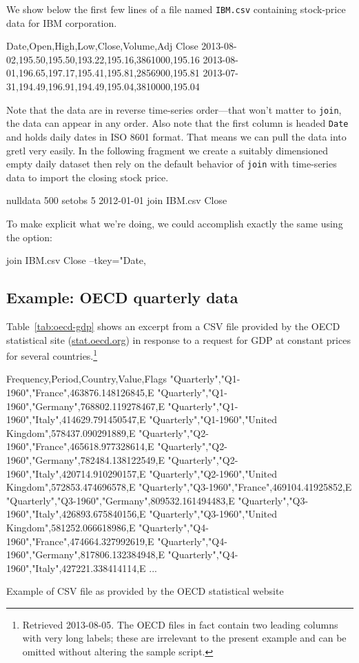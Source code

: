 We show below the first few lines of a file named \texttt{IBM.csv}
containing stock-price data for IBM corporation.

\begin{code}
Date,Open,High,Low,Close,Volume,Adj Close
2013-08-02,195.50,195.50,193.22,195.16,3861000,195.16
2013-08-01,196.65,197.17,195.41,195.81,2856900,195.81
2013-07-31,194.49,196.91,194.49,195.04,3810000,195.04
\end{code}

Note that the data are in reverse time-series order---that won't
matter to \texttt{join}, the data can appear in any order. Also note
that the first column is headed \texttt{Date} and holds daily dates in
ISO 8601 format. That means we can pull the data into gretl very
easily. In the following fragment we create a suitably dimensioned
empty daily dataset then rely on the default behavior of \texttt{join}
with time-series data to import the closing stock price.

\begin{code}
nulldata 500
setobs 5 2012-01-01
join IBM.csv Close
\end{code}

To make explicit what we're doing, we could accomplish exactly the
same using the  option:

\begin{code}
join IBM.csv Close --tkey="Date,%
\end{code}

\subsection{Example: OECD quarterly data}

Table~\ref{tab:oecd-gdp} shows an excerpt from a CSV file provided
by the OECD statistical site (\url{stat.oecd.org}) in response to a
request for GDP at constant prices for several
countries.\footnote{Retrieved 2013-08-05. The OECD files in fact
  contain two leading columns with very long labels; these are irrelevant
  to the present example and can be omitted without altering the
  sample script.}

\begin{table}[htbp]
\begin{code}
Frequency,Period,Country,Value,Flags
"Quarterly","Q1-1960","France",463876.148126845,E
"Quarterly","Q1-1960","Germany",768802.119278467,E
"Quarterly","Q1-1960","Italy",414629.791450547,E
"Quarterly","Q1-1960","United Kingdom",578437.090291889,E
"Quarterly","Q2-1960","France",465618.977328614,E
"Quarterly","Q2-1960","Germany",782484.138122549,E
"Quarterly","Q2-1960","Italy",420714.910290157,E
"Quarterly","Q2-1960","United Kingdom",572853.474696578,E
"Quarterly","Q3-1960","France",469104.41925852,E
"Quarterly","Q3-1960","Germany",809532.161494483,E
"Quarterly","Q3-1960","Italy",426893.675840156,E
"Quarterly","Q3-1960","United Kingdom",581252.066618986,E
"Quarterly","Q4-1960","France",474664.327992619,E
"Quarterly","Q4-1960","Germany",817806.132384948,E
"Quarterly","Q4-1960","Italy",427221.338414114,E
...
\end{code}
\caption{Example of CSV file as provided by the OECD statistical
  website}
\label{tab:oecd-gdp}  
\end{table}

